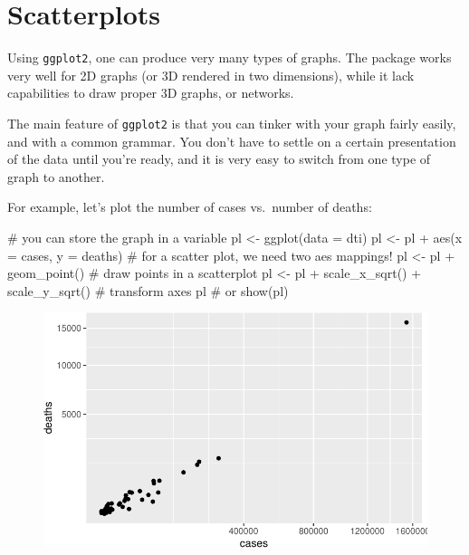 \documentclass[
  letterpaper,
  DIV=11,
  numbers=noendperiod]{scrreprt}
\newenvironment{Shaded}{\begin{snugshade}}{\end{snugshade}}
\newcommand{\AttributeTok}[1]{\textcolor[rgb]{0.40,0.45,0.13}{#1}}
\newcommand{\CommentTok}[1]{\textcolor[rgb]{0.37,0.37,0.37}{#1}}
\newcommand{\FunctionTok}[1]{\textcolor[rgb]{0.28,0.35,0.67}{#1}}
\newcommand{\NormalTok}[1]{\textcolor[rgb]{0.00,0.23,0.31}{#1}}
\newcommand{\OtherTok}[1]{\textcolor[rgb]{0.00,0.23,0.31}{#1}}
\newcommand{\SpecialCharTok}[1]{\textcolor[rgb]{0.37,0.37,0.37}{#1}}
\begin{document}
\hypertarget{scatterplots}{%
\section{Scatterplots}\label{scatterplots}}

Using \texttt{ggplot2}, one can produce very many types of graphs. The
package works very well for 2D graphs (or 3D rendered in two
dimensions), while it lack capabilities to draw proper 3D graphs, or
networks.

The main feature of \texttt{ggplot2} is that you can tinker with your
graph fairly easily, and with a common grammar. You don't have to settle
on a certain presentation of the data until you're ready, and it is very
easy to switch from one type of graph to another.

For example, let's plot the number of cases vs.~number of deaths:

\begin{Shaded}
\begin{Highlighting}[]
\CommentTok{\# you can store the graph in a variable}
\NormalTok{pl }\OtherTok{\textless{}{-}} \FunctionTok{ggplot}\NormalTok{(}\AttributeTok{data =}\NormalTok{ dti)}
\NormalTok{pl }\OtherTok{\textless{}{-}}\NormalTok{ pl }\SpecialCharTok{+} \FunctionTok{aes}\NormalTok{(}\AttributeTok{x =}\NormalTok{ cases, }\AttributeTok{y =}\NormalTok{ deaths) }\CommentTok{\# for a scatter plot, we need two aes mappings!}
\NormalTok{pl }\OtherTok{\textless{}{-}}\NormalTok{ pl }\SpecialCharTok{+} \FunctionTok{geom\_point}\NormalTok{() }\CommentTok{\# draw points in a scatterplot}
\NormalTok{pl }\OtherTok{\textless{}{-}}\NormalTok{ pl }\SpecialCharTok{+} \FunctionTok{scale\_x\_sqrt}\NormalTok{() }\SpecialCharTok{+} \FunctionTok{scale\_y\_sqrt}\NormalTok{() }\CommentTok{\# transform axes}
\NormalTok{pl }\CommentTok{\# or show(pl)}
\end{Highlighting}
\end{Shaded}

\begin{figure}[H]

{\centering \includegraphics{./01-dataviz_files/figure-pdf/unnamed-chunk-9-1.pdf}

}

\end{figure}
\end{document}
